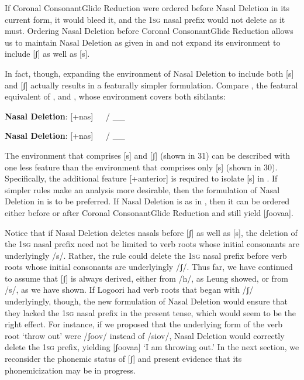 \documentclass[output=paper]{langsci/langscibook}
\begin{document}
If Coronal ConsonantGlide Reduction were ordered before Nasal Deletion in its current form, it would bleed it, and the 1\textsc{sg} nasal prefix would not delete as it must. Ordering Nasal Deletion before Coronal ConsonantGlide Reduction allows us to maintain Nasal Deletion as given in  and not expand its environment to include [ʃ] as well as [s]. 

In fact, though, expanding the environment of Nasal Deletion to include both [s] and [ʃ] actually results in a featurally simpler formulation. Compare , the featural equivalent of , and , whose environment covers both sibilants:

\ea{}
 \textbf{Nasal Deletion}: [+nas]   / \_\_ \\{}
\z

\ea{}
 \textbf{Nasal Deletion}: [+nas]   / \_\_ \\{}
\z



The environment that comprises [s] and [ʃ] (shown in 31) can be described with one less feature than the environment that comprises only [s] (shown in 30). Specifically, the additional feature [+anterior] is required to isolate [s] in . If simpler rules make an analysis more desirable, then the formulation of Nasal Deletion in  is to be preferred. If Nasal Deletion is as in , then it can be ordered either before or after Coronal ConsonantGlide Reduction and still yield [ʃoovaa]. 

Notice that if Nasal Deletion deletes nasals before [ʃ] as well as [s], the deletion of the 1\textsc{sg} nasal prefix need not be limited to verb roots whose initial consonants are underlyingly /s/. Rather, the rule could delete the 1\textsc{sg} nasal prefix before verb roots whose initial consonants are underlyingly /ʃ/. Thus far, we have continued to assume that [ʃ] is always derived, either from /h/, as Leung showed, or from /s/, as we have shown. If Logoori had verb roots that began with /ʃ/ underlyingly, though, the new formulation of Nasal Deletion would ensure that they lacked the 1\textsc{sg} nasal prefix in the present tense, which would seem to be the right effect. For instance, if we proposed that the underlying form of the verb root ‘throw out’ were /ʃoov/ instead of /siov/, Nasal Deletion would correctly delete the 1\textsc{sg} prefix, yielding [ʃoovaa] ‘I am throwing out.’ In the next section, we reconsider the phonemic status of [ʃ] and present evidence that its phonemicization may be in progress.
\end{document}

